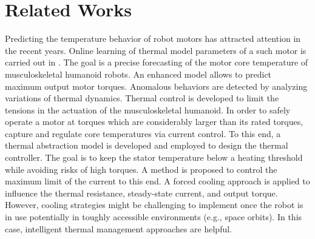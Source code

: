 \documentclass{ifacconf}
\begin{document}
\section{Related Works}
\label{chap:relatedworks}
Predicting the temperature behavior of robot motors has attracted attention in the recent years.  Online learning of thermal model parameters of a such motor is carried out in \cite{kawaharazuka2020estimation}. The goal is a precise forecasting  of the motor core
temperature of musculoskeletal humanoid robots. An enhanced model allows to predict  maximum output motor torques. Anomalous behaviors are detected by analyzing variations of  thermal dynamics. Thermal control is developed to limit the tensions in the actuation of the musculoskeletal humanoid. In order to safely operate a motor at torques which are considerably larger than its rated torques, \cite{singh2021thermal} capture and regulate  core temperatures via current control. To this end, a thermal abstraction  model is developed and employed to design the thermal controller. The goal is to keep the stator temperature below a heating threshold while avoiding risks of high torques. A method is proposed to control the maximum limit of the current to this end. A forced cooling approach is applied to influence the thermal resistance, steady-state current, and output torque. However, cooling strategies might be challenging to implement once the robot is in use potentially in  toughly accessible environments (e.g., space orbits). In this case, intelligent thermal management approaches are helpful.
\end{document}
